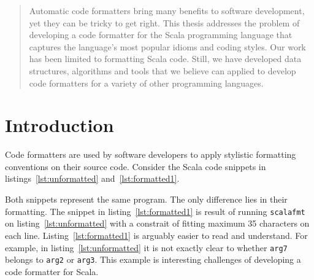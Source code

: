 \documentclass[11pt,a4paper]{article}
\newcommand{\scalafmt}{\texttt{scalafmt}}
\begin{document}






\begin{abstract}
  Automatic code formatters bring many benefits to software development, yet they can be tricky to get right.
  This thesis addresses the problem of developing a code formatter for the
  Scala programming language that captures the language's most popular idioms
  and coding styles.
  Our work has been limited to formatting Scala code.
  Still, we have developed data structures, algorithms and tools that we
  believe can applied to develop code formatters for a variety of other
  programming languages.
\end{abstract}
\tableofcontents
% 
\pagebreak
\section{Introduction} %
\label{sec:Introduction}
\lstset{style=scala}

Code formatters are used by software developers to apply stylistic formatting conventions on their source code.
Consider the Scala code snippets in listings~\ref{lst:unformatted} and~\ref{lst:formatted1}.

\noindent
\begin{minipage}{.45\textwidth}

\end{minipage}
\hfil
\begin{minipage}{.45\textwidth}

\end{minipage}
\hfil
Both snippets represent the same program.
The only difference lies in their formatting.
The snippet in listing~\ref{lst:formatted1} is result of running \scalafmt{} on listing~\ref{lst:unformatted}
with a constrait of fitting maximum 35 characters on each line.
Listing~\ref{lst:formatted1} is arguably easier to read and understand.
For example, in listing~\ref{lst:unformatted} it is not exactly clear to whether \texttt{arg7} belongs to \texttt{arg2} or \texttt{arg3}.
This example is interesting challenges of developing a code formatter for Scala.
\end{document}
